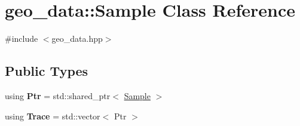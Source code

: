 \hypertarget{classgeo__data_1_1Sample}{}\section{geo\+\_\+data\+:\+:Sample Class Reference}
\label{classgeo__data_1_1Sample}


{\ttfamily \#include $<$geo\+\_\+data.\+hpp$>$}

\subsection*{Public Types}
\begin{DoxyCompactItemize}
\item 
using {\bfseries Ptr} = std\+::shared\+\_\+ptr$<$ \hyperlink{classgeo__data_1_1Sample}{Sample} $>$\hypertarget{classgeo__data_1_1Sample_adf7988c796ed7425dff198fbb3556fcc}{}\label{classgeo__data_1_1Sample_adf7988c796ed7425dff198fbb3556fcc}

\item 
using {\bfseries Trace} = std\+::vector$<$ Ptr $>$\hypertarget{classgeo__data_1_1Sample_a6dedccb71de46de1b2ad54227962c3d7}{}\label{classgeo__data_1_1Sample_a6dedccb71de46de1b2ad54227962c3d7}

\end{DoxyCompactItemize}
